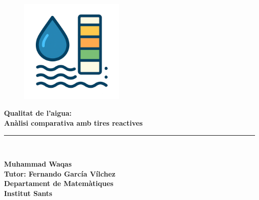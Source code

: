 \newlength{\centeroffset}
\setlength{\centeroffset}{-0.5\oddsidemargin}
\addtolength{\centeroffset}{0.5\evensidemargin}
\thispagestyle{empty}
\noindent\hspace*{\centeroffset}\begin{minipage}{\textwidth}
\begin{figure}[H]
\centering
\includegraphics[width=0.45\textwidth]{./Figures/ImatgeTR.png}
\end{figure}
\vspace*{3truecm}

\flushright
{\Huge\bfseries 
  Qualitat de l’aigua:\\
}
\vspace*{0.5truecm}
{\LARGE\bfseries
  Anàlisi comparativa amb tires reactives
}\\
\noindent\rule[-1ex]{\textwidth}{5pt}\\[4.5ex]
\end{minipage}

\noindent\hspace*{\centeroffset}\begin{minipage}{\textwidth}
\flushright
{\bfseries 
	Muhammad Waqas\\
	Tutor: Fernando García Vílchez \\
	Departament de Matemàtiques\\
	Institut Sants\\
}
\end{minipage}


